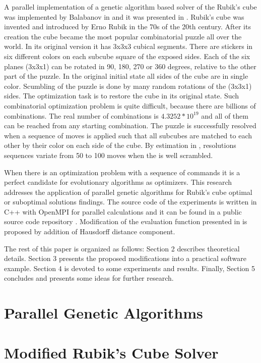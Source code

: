 \documentclass[runningheads]{llncs}
\begin{document}
A parallel implementation of a genetic algorithm based solver of the Rubik's cube was implemented by Balabanov in \cite{balabanov01} and it was presented in \cite{balabanov02}. Rubik's cube was invented and introduced by Erno Rubik in the 70s of the 20th century. After its creation the cube became the most popular combinatorial puzzle all over the world. In its original version it has 3x3x3 cubical segments. There are stickers in six different colors on each subcube square of the exposed sides. Each of the six planes (3x3x1) can be rotated in 90, 180, 270 or 360 degrees, relative to the other part of the puzzle. In the original initial state all sides of the cube are in single color. Scumbling of the puzzle is done by many random rotations of the (3x3x1) sides. The optimization task is to restore the cube in its original state. Such combinatorial optimization problem is quite difficult, because there are billions of combinations. The real number of combinations is $4.3252*10^{19}$ \cite{korf01} and all of them can be reached from any starting combination. The puzzle is successfully resolved when a sequence of moves is applied such that all subcubes are matched to each other by their color on each side of the cube. By estimation in \cite{korf01}, resolutions sequences variate from 50 to 100 moves when the is well scrambled. 

When there is an optimization problem with a sequence of commands it is a perfect candidate for evolutionary algorithms as optimizers. This research addresses the application of parallel genetic algorithms for Rubik's cube optimal or suboptimal solutions findings. The source code of the experiments is written in C++ with OpenMPI for parallel calculations and it can be found in a public source code repository \cite{balabanov01}. Modification of the evaluation function presented in \cite{balabanov02} is proposed by addition of Hausdorff distance component.

The rest of this paper is organized as follows: Section 2 describes theoretical details. Section 3 presents the proposed modifications into a practical software example. Section 4 is devoted to some experiments and results. Finally, Section 5 concludes and presents some ideas for further research.

\section{Parallel Genetic Algorithms}

\section{Modified Rubik's Cube Solver}
\end{document}
